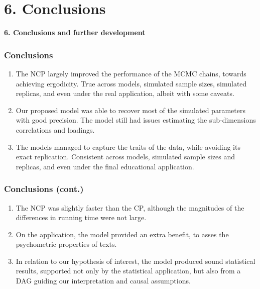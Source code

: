 \documentclass[arial,12pt,xcolor=dvipsnames]{beamer}
\begin{document}
\section{6. Conclusions}
%
\begin{frame}
	\textbf{6. Conclusions and further development}
\end{frame}
%
\begin{frame}
	\frametitle{Conclusions}
	\begin{enumerate}
		\item The NCP largely improved the performance of the MCMC chains, towards achieving ergodicity. True across models, simulated sample sizes, simulated replicas, and even under the real application, albeit with some caveats.
		\item Our proposed model was able to recover most of the simulated parameters with good precision. The model still had issues estimating the sub-dimensions correlations and loadings.
		\item The models managed to capture the traits of the data, while avoiding its exact replication. Consistent across models, simulated sample sizes and replicas, and even under the final educational application.
	\end{enumerate}
\end{frame}
%
\begin{frame}
	\frametitle{Conclusions (cont.)}
	\begin{enumerate}
		\item The NCP was slightly faster than the CP, although the magnitudes of the differences in running time were not large.
		\item On the application, the model provided an extra benefit, to asses the psychometric properties of texts.
		\item In relation to our hypothesis of interest, the model produced
		sound statistical results, supported not only by the statistical application, but also from a DAG guiding our interpretation and causal assumptions.
	\end{enumerate}
\end{frame}
%
\end{document}
